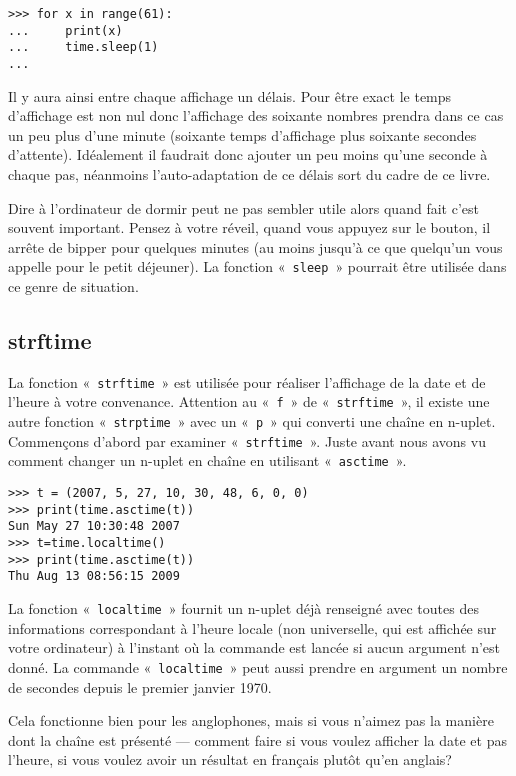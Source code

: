 \begin{Verbatim}[frame=single,rulecolor=\color{gray}]
>>> for x in range(61):
...     print(x)
...     time.sleep(1)
...
\end{Verbatim}
Il y aura ainsi entre chaque affichage un délais. Pour être exact le temps d'affichage est non nul donc l'affichage des soixante nombres prendra dans ce cas un peu plus d'une minute (soixante temps d'affichage plus soixante secondes d'attente). Idéalement il faudrait donc ajouter un peu moins qu'une seconde à chaque pas, néanmoins l'auto-adaptation de ce délais sort du cadre de ce livre.

Dire à l'ordinateur de dormir peut ne pas sembler utile alors quand fait c'est souvent important. Pensez à votre réveil, quand vous appuyez sur le bouton, il arrête de bipper pour quelques minutes (au moins jusqu'à ce que quelqu'un vous appelle pour le petit déjeuner). La fonction « \texttt{sleep} » pourrait être utilisée dans ce genre de situation.

\subsection{strftime}

La fonction « \texttt{strftime} » est utilisée pour réaliser l'affichage de la date et de l'heure à votre convenance. Attention au « \texttt{f} » de « \texttt{strftime} », il existe une autre fonction « \texttt{strptime} » avec un « \texttt{p} » qui converti une chaîne en n-uplet.
Commençons d'abord par examiner « \texttt{strftime} ».
Juste avant nous avons vu comment changer un n-uplet en chaîne en utilisant « \texttt{asctime} ».

\begin{Verbatim}[frame=single,rulecolor=\color{gray}]
>>> t = (2007, 5, 27, 10, 30, 48, 6, 0, 0)
>>> print(time.asctime(t))
Sun May 27 10:30:48 2007
>>> t=time.localtime()
>>> print(time.asctime(t))
Thu Aug 13 08:56:15 2009
\end{Verbatim}



La fonction « \texttt{localtime} » fournit un n-uplet déjà renseigné avec toutes des informations correspondant à l'heure locale (non universelle, qui est affichée sur votre ordinateur) à l'instant où la commande est lancée si aucun argument n'est donné. La commande « \texttt{localtime} » peut aussi prendre en argument un nombre de secondes depuis le premier janvier 1970.   

Cela fonctionne bien pour les anglophones, mais si vous n'aimez pas la manière dont la chaîne est présenté --- comment faire si vous voulez afficher la date et pas l'heure, si vous voulez avoir un résultat en français plutôt qu'en anglais?

